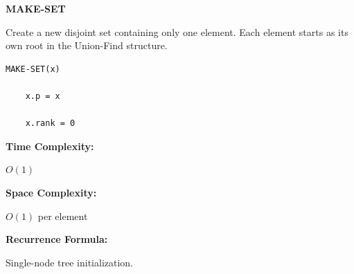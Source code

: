 \documentclass[a4paper,12pt]{article}
\begin{document}
\begin{tcolorbox}[
    colback=gray!30,
    colframe=black,
    boxrule=1pt,
    arc=0mm
]

\begin{tcolorbox}[
    colback=gray!10,
    colframe=black,
    arc=0mm
]
\centering
{\Huge\bfseries MAKE-SET}
\end{tcolorbox}


\begin{tcolorbox}[
    colback=gray!10,
    colframe=black,
    arc=0mm
]
\small
Create a new disjoint set containing only one element.
Each element starts as its own root in the Union-Find structure.
\end{tcolorbox}


\begin{tcolorbox}[
    colback=black!5,
    colframe=black,
    arc=0mm,
    title=Pseudo-code
]
\tiny
\begin{lstlisting}
MAKE-SET(x)

    x.p = x

    x.rank = 0
\end{lstlisting}
\end{tcolorbox}


\begin{tcolorbox}[
    colback=cyan!20,
    colframe=black,
    arc=0mm
]
\small
\textbf{Time Complexity:}

$O(1)$
\end{tcolorbox}


\begin{tcolorbox}[
    colback=violet!20,
    colframe=black,
    arc=0mm
]
\small
\textbf{Space Complexity:}

$O(1)$ per element
\end{tcolorbox}


\begin{tcolorbox}[
    colback=pink!20,
    colframe=black,
    arc=0mm
]
\small
\textbf{Recurrence Formula:}

Single-node tree initialization.
\end{tcolorbox}

\end{tcolorbox}
\end{document}
